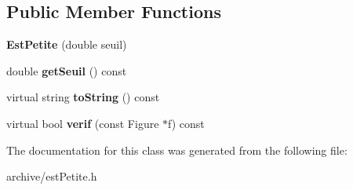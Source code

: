 \subsection*{Public Member Functions}
\begin{DoxyCompactItemize}
\item 
{\bfseries Est\+Petite} (double seuil)\hypertarget{class_est_petite_af8f816b95d9a14dc7629fa16de267f00}{}\label{class_est_petite_af8f816b95d9a14dc7629fa16de267f00}

\item 
double {\bfseries get\+Seuil} () const \hypertarget{class_est_petite_ad61c2808fedec928fc3b306a62e648ee}{}\label{class_est_petite_ad61c2808fedec928fc3b306a62e648ee}

\item 
virtual string {\bfseries to\+String} () const \hypertarget{class_est_petite_adb7ca26ffd55246f9f3054c711dfdc14}{}\label{class_est_petite_adb7ca26ffd55246f9f3054c711dfdc14}

\item 
virtual bool {\bfseries verif} (const Figure $\ast$f) const \hypertarget{class_est_petite_a81a65daa468125807a527178307f138b}{}\label{class_est_petite_a81a65daa468125807a527178307f138b}

\end{DoxyCompactItemize}


The documentation for this class was generated from the following file\+:\begin{DoxyCompactItemize}
\item 
archive/est\+Petite.\+h\end{DoxyCompactItemize}
